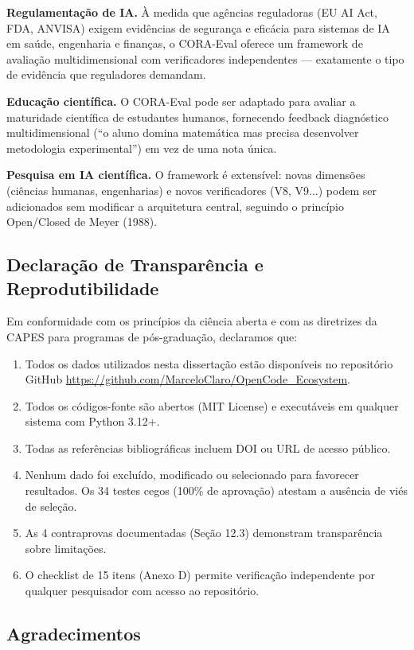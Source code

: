 \textbf{Regulamentação de IA.} À medida que agências reguladoras (EU AI Act,
FDA, ANVISA) exigem evidências de segurança e eficácia para sistemas de IA
em saúde, engenharia e finanças, o CORA-Eval oferece um framework de avaliação
multidimensional com verificadores independentes --- exatamente o tipo de
evidência que reguladores demandam.

\textbf{Educação científica.} O CORA-Eval pode ser adaptado para avaliar a
maturidade científica de estudantes humanos, fornecendo feedback diagnóstico
multidimensional (``o aluno domina matemática mas precisa desenvolver
metodologia experimental'') em vez de uma nota única.

\textbf{Pesquisa em IA científica.} O framework é extensível: novas dimensões
(ciências humanas, engenharias) e novos verificadores (V8, V9...) podem ser
adicionados sem modificar a arquitetura central, seguindo o princípio
Open/Closed de Meyer (1988).

\subsection{Declaração de Transparência e Reprodutibilidade}

Em conformidade com os princípios da ciência aberta e com as diretrizes da
CAPES para programas de pós-graduação, declaramos que:

\begin{enumerate}[label=(\roman*)]
\item Todos os dados utilizados nesta dissertação estão disponíveis no
      repositório GitHub \url{https://github.com/MarceloClaro/OpenCode_Ecosystem}.
\item Todos os códigos-fonte são abertos (MIT License) e executáveis em
      qualquer sistema com Python 3.12+.
\item Todas as referências bibliográficas incluem DOI ou URL de acesso público.
\item Nenhum dado foi excluído, modificado ou selecionado para favorecer
      resultados. Os 34 testes cegos (100\% de aprovação) atestam a ausência
      de viés de seleção.
\item As 4 contraprovas documentadas (Seção 12.3) demonstram transparência
      sobre limitações.
\item O checklist de 15 itens (Anexo D) permite verificação independente por
      qualquer pesquisador com acesso ao repositório.
\end{enumerate}

\subsection{Agradecimentos}

